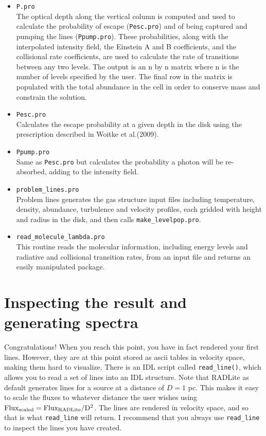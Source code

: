 \documentclass[11pt]{article}
\begin{document}
\begin{itemize}
\item{\tt P.pro}\\
The optical depth along the vertical column is computed and used to calculate the probability of escape ({\tt Pesc.pro}) and of being captured and pumping the lines ({\tt Ppump.pro}).  These probabilities, along with the interpolated intensity field, the Einstein A and B coefficients, and the collisional rate coefficients, are used to calculate the rate of transitions between any two levels.  The output is an n by n matrix where n is the number of levels specified by the user.  The final row in the matrix is populated with the total abundance in the cell in order to conserve mass and constrain the solution.

\item{\tt Pesc.pro}\\
Calculates the escape probability at a given depth in the disk using the prescription described in Woitke et al.(2009).

\item{\tt Ppump.pro}\\
Same as {\tt Pesc.pro} but calculates the probability a photon will be re-absorbed, adding to the intensity field.

\item {\tt problem\_lines.pro}\\
Problem lines generates the gas structure input files including temperature, density, abundance, turbulence and velocity profiles, each gridded with height and radius in the disk, and then calls {\tt make\_levelpop.pro}.

\item{\tt read\_molecule\_lambda.pro}\\
This routine reads the molecular information, including energy levels and radiative and collisional transition rates, from an input file and returns an easily manipulated package.
 
\end{itemize}

\section{Inspecting the result and generating spectra}

Congratulations! When you reach this point, you have in fact rendered your first lines. However, they are at this point stored as ascii tables in
velocity space, making them hard to visualize. There is an IDL script called {\tt read\_line()}, which allows you to read a 
set of lines into an IDL structure. Note that RADLite as default generates lines for a source at a distance of $D=1$ pc.
This makes it easy to scale the fluxes to whatever distance the user wishes using $\rm Flux_{scaled} = Flux_{RADLite}/D^2$.
The lines are rendered in velocity space, and so that is what {\tt read\_line} will return. 
I recommend that you always use {\tt read\_line} to inspect the lines you have created. 
\end{document}

